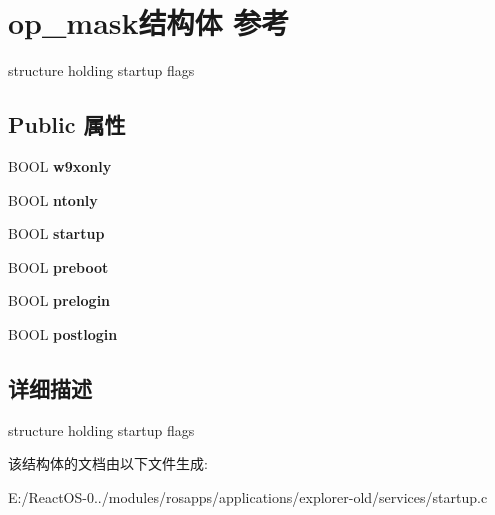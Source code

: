 \hypertarget{structop__mask}{}\section{op\+\_\+mask结构体 参考}
\label{structop__mask}


structure holding startup flags  


\subsection*{Public 属性}
\begin{DoxyCompactItemize}
\item 
\mbox{\label{structop__mask_a22f7250292b8a1b453c70ff7bed8e163}} 
B\+O\+OL {\bfseries w9xonly}
\item 
\mbox{\label{structop__mask_a15778a9909c91d4e9cbefba6f98aa948}} 
B\+O\+OL {\bfseries ntonly}
\item 
\mbox{\label{structop__mask_a69cbcdffeeb9ccb03a71a9dee8ade74b}} 
B\+O\+OL {\bfseries startup}
\item 
\mbox{\label{structop__mask_ae397b23cc1a53dd8d63ae45d5eaae5ed}} 
B\+O\+OL {\bfseries preboot}
\item 
\mbox{\label{structop__mask_a232b6cf7acc126e6d6c41f7938965e55}} 
B\+O\+OL {\bfseries prelogin}
\item 
\mbox{\label{structop__mask_a2cc1b899bd890a5bc41828337329b4e6}} 
B\+O\+OL {\bfseries postlogin}
\end{DoxyCompactItemize}


\subsection{详细描述}
structure holding startup flags 

该结构体的文档由以下文件生成\+:\begin{DoxyCompactItemize}
\item 
E\+:/\+React\+O\+S-\/0../modules/rosapps/applications/explorer-\/old/services/startup.\+c\end{DoxyCompactItemize}

